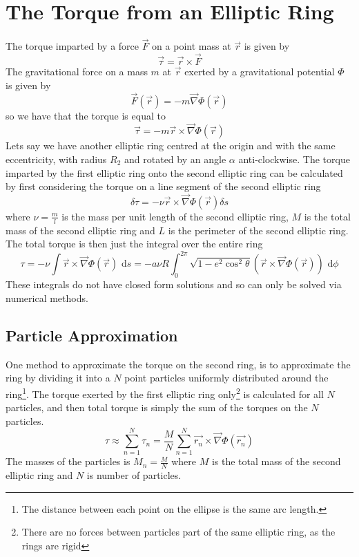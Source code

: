 \section{The Torque from an Elliptic Ring}
The torque imparted by a force \( \vec{F} \) on a point mass at \( \vec{r} \) is given by
\begin{equation}
    \vec{\tau} = \vec{r} \times \vec{F}
\end{equation}
The gravitational force on a mass \( m \) at \( \vec{r} \) exerted by a gravitational potential \( \Phi \) is given by
\begin{equation}
    \vec{F}(\vec{r}) = -m\vec{\nabla} \Phi(\vec{r})
\end{equation}
so we have that the torque is equal to
\begin{equation}
    \vec{\tau} = -m\vec{r} \times \vec{\nabla} \Phi(\vec{r})
\end{equation}
Lets say we have another elliptic ring centred at the origin and with the same eccentricity,
with radius \( R_2 \) and rotated by an angle \( \alpha \) anti-clockwise. The torque
imparted by the first elliptic ring onto the second elliptic ring can be calculated by
first considering the torque on a line segment of the second elliptic ring
\begin{equation}
    \delta \tau = -\nu \vec{r} \times \vec{\nabla} \Phi(\vec{r}) \delta s
\end{equation}
where \( \nu = \frac{m}{l} \) is the mass per unit length of the second elliptic ring, \( M \) is the
total mass of the second elliptic ring and \( L \) is the perimeter of the second elliptic ring. The total
torque is then just the integral over the entire ring
\begin{equation}
    \tau
    = -\nu \int \vec{r} \times \vec{\nabla} \Phi(\vec{r}) \,{}\,{} \mathrm{d}s
    = -a\nu R \int_{0}^{2\pi} \sqrt{1 - e^2\cos^2{\theta}} \left(\vec{r} \times \vec{\nabla} \Phi(\vec{r})\right) \,\,{} \mathrm{d}\phi
\end{equation}
These integrals do not have closed form solutions and so can only be solved via numerical methods.

\subsection{Particle Approximation}
One method to approximate the torque on the second ring, is to approximate the ring by
dividing it into a \( N \) point particles uniformly distributed around the
ring\footnote{The distance between each point on the ellipse is the same arc length.}.
The torque exerted by the first elliptic ring
only\footnote{There are no forces between particles part of the same elliptic ring, as the rings are rigid}
is calculated for all \( N \) particles, and then total torque is simply the sum of the
torques on the \( N \) particles.
\begin{equation}
    \tau \approx \sum_{n=1}^{N} \tau_n = \frac{M}{N} \sum_{n=1}^{N} \vec{r_n} \times \vec{\nabla} \Phi(\vec{r_n})
\end{equation}
The masses of the particles is \( M_n = \frac{M}{N} \) where \( M \) is the total mass of the second elliptic ring and \( N \) is
number of particles.

